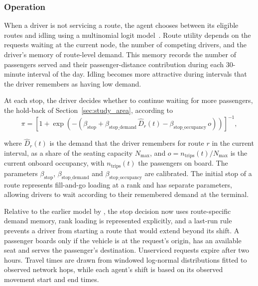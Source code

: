 \documentclass{elsarticle}
\begin{document}
\subsubsection{Operation}

When a driver is not servicing a route, the agent chooses between its eligible routes and idling using a multinomial logit model~\cite{mcfadden1974_mnl}. Route utility depends on the requests waiting at the current node, the number of competing drivers, and the driver's memory of route-level demand. This memory records the number of passengers served and their passenger-distance contribution during each 30-minute interval of the day. Idling becomes more attractive during intervals that the driver remembers as having low demand.

At each stop, the driver decides whether to continue waiting for more passengers, the hold-back of Section~\ref{sec:study_area}, according to
\begin{equation}
    \pi = \left[ 1 + \exp\left(-\left(\beta_{\text{stop}} + \beta_{\text{stop\_demand}}\, \hat{D}_r(t) - \beta_{\text{stop\_occupancy}}\, o\right)\right) \right]^{-1},
\end{equation}

\noindent where \(\hat{D}_r(t)\) is the demand that the driver remembers for route \(r\) in the current interval, as a share of the seating capacity \(N_{\text{max}}\), and \(o = n_\text{trips}(t)/N_{\text{max}}\) is the current onboard occupancy, with \(n_\text{trips}(t)\) the passengers on board. The parameters \(\beta_{\text{stop}}\), \(\beta_{\text{stop\_demand}}\) and \(\beta_{\text{stop\_occupancy}}\) are calibrated. The initial stop of a route represents fill-and-go loading at a rank and has separate parameters, allowing drivers to wait according to their remembered demand at the terminal.

Relative to the earlier model by \citet{sello2025_stellenbosch_embt_abm}, the stop decision now uses route-specific demand memory, rank loading is represented explicitly, and a last-run rule prevents a driver from starting a route that would extend beyond its shift. A passenger boards only if the vehicle is at the request's origin, has an available seat and serves the passenger's destination. Unserviced requests expire after two hours. Travel times are drawn from windowed log-normal distributions fitted to observed network hops, while each agent's shift is based on its observed movement start and end times.
\end{document}
